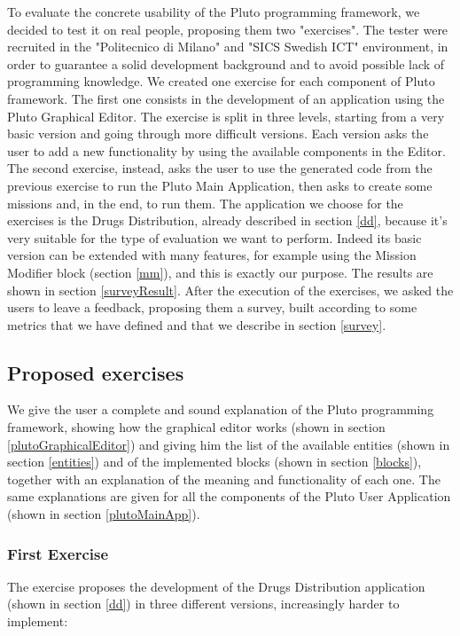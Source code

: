 To evaluate the concrete usability of the Pluto programming framework, we decided to test it on real people, proposing them two "exercises".
The tester were recruited in the "Politecnico di Milano" and "SICS Swedish ICT" environment, in order to guarantee a solid development background and to avoid possible lack of programming knowledge.
We created one exercise for each component of Pluto framework.
The first one consists in the development of an application using the Pluto Graphical Editor.
The exercise is split in three levels, starting from a very basic version and going through more difficult versions. Each version asks the user to add a new functionality by using the available components in the Editor.
The second exercise, instead, asks the user to use the generated code from the previous exercise to run the Pluto Main Application, then asks to create some missions and, in the end, to run them.
The application we choose for the exercises is the Drugs Distribution, already described in section \ref{dd}, because it's very suitable for the type of evaluation we want to perform.
Indeed its basic version can be extended with many features, for example using the Mission Modifier block (section \ref{mm}), and this is exactly our purpose.
The results are shown in section \ref{surveyResult}.
After the execution of the exercises, we asked the users to leave a feedback, proposing them a survey, built according to some metrics that we have defined and that we describe in section \ref{survey}.

\subsection{Proposed exercises}
\label{exercise}

We give the user a complete and sound explanation of the Pluto programming framework, showing how the graphical editor works (shown in section \ref{plutoGraphicalEditor}) and giving him the list of the available entities (shown in section \ref{entities}) and of the implemented blocks (shown in section \ref{blocks}), together with an explanation of the meaning and functionality of each one.
The same explanations are given for all the components of the Pluto User Application (shown in section \ref{plutoMainApp}).

\subsubsection{First Exercise}

The exercise proposes the development of the Drugs Distribution application (shown in section \ref{dd}) in three different versions, increasingly harder to implement:

